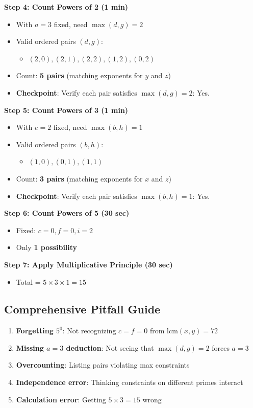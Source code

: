 \documentclass[12pt]{article}
\begin{document}
\begin{roadmapbox}
\textbf{Step 4: Count Powers of 2 (1 min)}
\begin{itemize}
    \item With $a = 3$ fixed, need $\max(d,g) = 2$
    \item Valid ordered pairs $(d,g)$: 
    \begin{itemize}
        \item $(2,0), (2,1), (2,2), (1,2), (0,2)$
    \end{itemize}
    \item Count: \textbf{5 pairs} (matching exponents for $y$ and $z$)
    \item \textbf{Checkpoint}: Verify each pair satisfies $\max(d,g) = 2$: Yes.
\end{itemize}

\textbf{Step 5: Count Powers of 3 (1 min)}
\begin{itemize}
    \item With $e = 2$ fixed, need $\max(b,h) = 1$
    \item Valid ordered pairs $(b,h)$:
    \begin{itemize}
        \item $(1,0), (0,1), (1,1)$
    \end{itemize}
    \item Count: \textbf{3 pairs} (matching exponents for $x$ and $z$)
    \item \textbf{Checkpoint}: Verify each pair satisfies $\max(b,h) = 1$: Yes.
\end{itemize}

\textbf{Step 6: Count Powers of 5 (30 sec)}
\begin{itemize}
    \item Fixed: $c = 0, f = 0, i = 2$
    \item Only \textbf{1 possibility}
\end{itemize}

\textbf{Step 7: Apply Multiplicative Principle (30 sec)}
\begin{itemize}
    \item Total = $5 \times 3 \times 1 = 15$
\end{itemize}

\subsection*{Comprehensive Pitfall Guide}
\begin{enumerate}
    \item \textbf{Forgetting $5^0$}: Not recognizing $c=f=0$ from $\text{lcm}(x,y)=72$
    \item \textbf{Missing $a=3$ deduction}: Not seeing that $\max(d,g)=2$ forces $a=3$
    \item \textbf{Overcounting}: Listing pairs violating max constraints
    \item \textbf{Independence error}: Thinking constraints on different primes interact
    \item \textbf{Calculation error}: Getting $5 \times 3 = 15$ wrong
\end{enumerate}
\end{roadmapbox}
\end{document}
